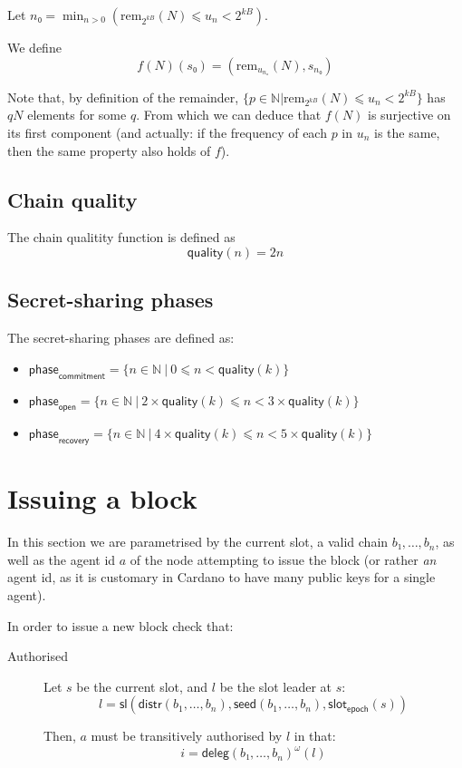 \documentclass{article}
\newcommand{\rem}[2]{\mathrm{rem}_{#1}(#2)}
\newcommand{\slotleader}[3]{\mathsf{sl}(#1,#2,#3)}
\newcommand{\transitivefix}[1]{{#1}^ω}
\newcommand{\delegations}[1]{\mathsf{deleg}(#1)}
\newcommand{\epochslot}[1]{\mathsf{slot}_\mathsf{epoch}(#1)}
\newcommand{\epochseed}[1]{\mathsf{seed}(#1)}
\newcommand{\epochdistribution}[1]{\mathsf{distr}(#1)}
\newcommand{\quality}[1]{\mathsf{quality}(#1)}
\newcommand{\commitphase}{\mathsf{phase}_\mathsf{commitment}}
\newcommand{\openphase}{\mathsf{phase}_\mathsf{open}}
\newcommand{\recoveryphase}{\mathsf{phase}_\mathsf{recovery}}
\begin{document}
Let $n₀ = \min_{n>0} \left(\rem{2^{kB}}{N} ⩽ u_n < 2^{kB}\right)$.

We define
$$
f(N)(s₀) = (\rem{u_{n₀}}{N}, s_{n₀})
$$

Note that, by definition of the remainder,
$\{ p∈ℕ | \rem{2^{kB}}{N} ⩽ u_n < 2^{kB} \}$ has $qN$ elements for
some $q$. From which we can deduce that $f(N)$ is surjective on its
first component (and actually: if the frequency of each $p$ in $u_n$
is the same, then the same property also holds of $f$).

\subsection{Chain quality}
\label{sec:chain-quality}

The chain qualitity function is defined as
$$
\quality{n} = 2n
$$
\subsection{Secret-sharing phases}
\label{sec:vss-phases}

The secret-sharing phases are defined as:
\begin{itemize}
\item $\commitphase = \{ n∈ℕ~|~0 ⩽ n < \quality{k} \}$
\item $\openphase = \{ n∈ℕ~|~2×\quality{k} ⩽ n < 3×\quality{k} \}$
\item $\recoveryphase = \{ n∈ℕ~|~4×\quality{k} ⩽ n < 5×\quality{k} \}$
\end{itemize}

\section{Issuing a block}
\label{sec:extending-blockchain}


In this section we are parametrised by the current slot, a valid chain
$b₁,…,b_n$, as well as the agent id $a$ of the node attempting to issue
the block (or rather \emph{an} agent id, as it is customary in Cardano
to have many public keys for a single agent).

In order to issue a new block check that:
\begin{description}
\item[Authorised] Let $s$ be the current slot, and $l$ be the slot
  leader at $s$:
  $$
  l = \slotleader{\epochdistribution{b_1,…,b_n}}{\epochseed{b_1,…,b_n}}{\epochslot{s}}
  $$

  Then, $a$ must be transitively authorised by $l$ in that:
  $$
  i = \transitivefix{\delegations{b₁,…,b_n}}(l)
  $$
\end{description}
\end{document}
